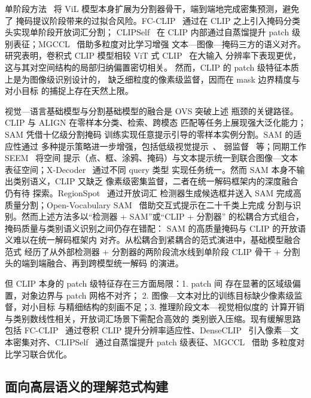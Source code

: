 单阶段方法~\cite{yu2023convolutions,wu2024clipself,MGCCL} 将 ViL 模型本身扩展为分割器骨干，端到端地完成密集预测，避免了 掩码提议阶段带来的过拟合风险。FC-CLIP~\cite{yu2023convolutions} 通过在 CLIP 之上引入掩码分类头实现单阶段开放词汇分割； CLIPSelf~\cite{wu2024clipself} 在 CLIP 内部通过自蒸馏提升 patch 级别表征；MGCCL~\cite{MGCCL} 借助多粒度对比学习增强 文本—图像—掩码三方的语义对齐。研究表明，卷积式 CLIP 模型相较 ViT 式 CLIP~\cite{dosovitskiy2021image} 在大输入 分辨率下表现更优，这与其对空间结构的局部归纳偏置密切相关。 然而，CLIP 的 patch 级特征本质上是为图像级识别设计的， 缺乏细粒度的像素级监督，因而在 mask 边界精度与对小目标 的捕捉上存在天然上限。

视觉—语言基础模型与分割基础模型的融合是 OVS 突破上述 瓶颈的关键路径。CLIP 与 ALIGN 在零样本分类、检索、跨模态 匹配等任务上展现强大泛化能力；SAM 凭借十亿级分割掩码 训练实现任意提示引导的零样本实例分割。SAM 的适应性通过 多种提示策略进一步增强，包括低级视觉提示~\cite{MMRAD}、 弱监督~\cite{ROSE} 等；同期工作 SEEM~\cite{seem} 将空间 提示（点、框、涂鸦、掩码）与文本提示统一到联合图像—文本 表征空间；X-Decoder~\cite{zou2023seg} 通过不同 query 类型 实现任务统一。然而 SAM 本身不输出类别语义，CLIP 又缺乏 像素级密集监督，二者在统一解码框架内的深度融合仍有待 探索。RegionSpot~\cite{yang2024recognize} 通过开放词汇 检测器生成候选框并送入 SAM 完成高质量分割；Open-Vocabulary SAM~\cite{yuan2024open} 借助交互式提示在二十千类上完成 分割与识别。然而上述方法多以“检测器 + SAM”或“CLIP + 分割器” 的松耦合方式组合，掩码质量与类别语义识别之间仍存在错配： SAM 的高质量掩码与 CLIP 的开放语义难以在统一解码框架内 对齐。从松耦合到紧耦合的范式演进中，基础模型融合范式 经历了从外部检测器 + 分割器的两阶段流水线到单阶段 CLIP 骨干 + 分割头的端到端融合、再到跨模型统一解码 的演进。

但 CLIP 本身的 patch 级特征存在三方面局限：1. patch 间 存在显著的区域级偏置，对象边界与 patch 网格不对齐； 2. 图像—文本对比的训练目标缺少像素级监督，对小目标 与精细结构的刻画不足；3. 推理阶段文本—视觉相似度的 计算开销与类别数线性相关，开放词汇场景下需配合高效的 类别嵌入压缩。现有缓解思路包括 FC-CLIP~\cite{yu2023convolutions} 通过卷积 CLIP 提升分辨率适应性、DenseCLIP~\cite{rao2022denseclip} 引入像素—文本密集对齐、CLIPSelf~\cite{wu2024clipself} 通过自蒸馏提升 patch 级表征、MGCCL~\cite{MGCCL} 借助 多粒度对比学习联合优化。


\subsection{面向高层语义的理解范式构建}

